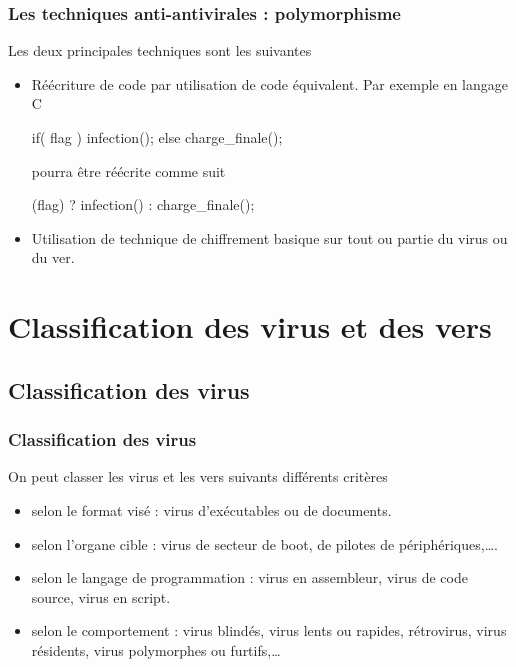 \documentclass{beamer}
\begin{document}
\begin{frame}
\frametitle{Les techniques anti-antivirales : polymorphisme}

Les deux principales techniques sont les suivantes


\begin{itemize}
\item Réécriture de code par utilisation de code équivalent. Par exemple en langage C
\begin{flushleft}
\begin{tt}
if( flag ) infection();
else charge\_finale();
\end{tt}
\end{flushleft}
pourra être réécrite comme suit
\begin{flushleft}
\begin{tt}
(flag) ? infection() : charge\_finale();
\end{tt}
\end{flushleft}
\medskip

\item Utilisation de technique de chiffrement basique sur tout ou partie du virus ou du ver. %


\end{itemize}
\end{frame}



\section{Classification des virus et des vers}


\subsection{Classification des virus}
\begin{frame}
\frametitle{Classification des virus}
On peut classer les virus et les vers suivants différents critères
\begin{itemize}
\item selon le format visé : virus {\color{blue} d'exécutables } ou de {\color{blue} documents.}
\item selon l'organe cible : virus de {\color{blue} secteur de boot, de pilotes de périphériques},\ldots.
\item selon le langage de programmation : virus en assembleur, virus de code source, virus en script.
\item selon le comportement : virus blindés, virus lents ou rapides, rétrovirus, virus résidents, virus polymorphes ou furtifs,\ldots
\end{itemize}
\end{frame}
\end{document}
